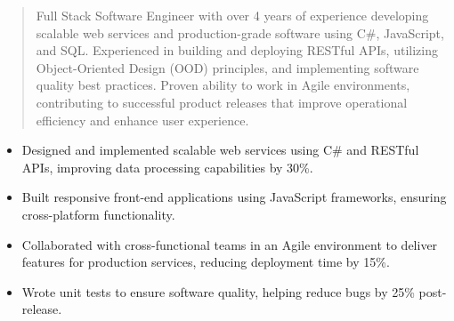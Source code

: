 



\makecvheader

\begin{quote}
  \noindent
  Full Stack Software Engineer with over 4 years of experience developing scalable web services and production-grade software using C\#, JavaScript, and SQL. Experienced in building and deploying RESTful APIs, utilizing Object-Oriented Design (OOD) principles, and implementing software quality best practices. Proven ability to work in Agile environments, contributing to successful product releases that improve operational efficiency and enhance user experience.
\end{quote}

\par\smallskip
\noindent
\begin{minipage}{20cm}
  \begin{minipage}{9.75cm}
    \begin{itemize}
      \item Designed and implemented scalable web services using C\# and RESTful APIs, improving data processing capabilities by 30\%.
      \item Built responsive front-end applications using JavaScript frameworks, ensuring cross-platform functionality.
    \end{itemize}
  \end{minipage}
  \hfill
  \begin{minipage}{9.75cm}
    \begin{itemize}
      \item Collaborated with cross-functional teams in an Agile environment to deliver features for production services, reducing deployment time by 15\%.
      \item Wrote unit tests to ensure software quality, helping reduce bugs by 25\% post-release.
    \end{itemize}
  \end{minipage}
\end{minipage}
\par\smallskip
\divider

